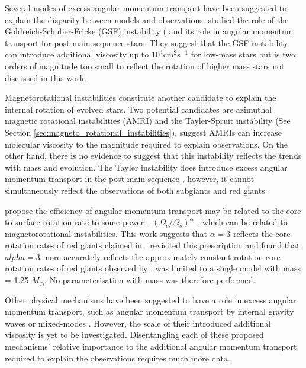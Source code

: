 Several modes of excess angular momentum transport have been suggested to explain the disparity between models and observations.
\citet{barker_angular_2019,barker_angular_2020} studied the role of
the Goldreich-Schuber-Fricke (GSF) instability (\citep{goldreich_differential_1967,fricke_rotation_1967} and its role in angular momentum transport for post-main-sequence stars.
They suggest that the GSF instability can introduce additional viscosity up to $10^4 \text{cm}^2 \text{s}^{-1}$ for low-mass stars but is two orders of magnitude too small to reflect the rotation of higher mass stars not discussed in this work.

Magnetorotational instabilities constitute another candidate to explain the internal rotation of evolved stars.
Two potential candidates are azimuthal magnetic rotational instabilities (AMRI) \citep{ruediger_astrophysical_2014,rudiger_diffusive_2015} and the Tayler-Spruit instability \citep{spruit_dynamo_2002} (See Section \ref{sec:magneto_rotational_instabilities}).
\citet{rudiger_diffusive_2015} suggest AMRIs can increase molecular viscosity to the magnitude required to explain observations.
On the other hand, there is no evidence to suggest that this instability reflects the trends with mass and evolution.
The Tayler instability does introduce excess angular momentum transport in the post-main-sequence \citep{fuller_slowing_2019}, however, it cannot simultaneously reflect the observations of both subgiants and red giants \citep{eggenberger_asteroseismology_2019,den_hartogh_constraining_2019}.


\citet{spada_angular_2016} propose the efficiency of angular momentum transport may be related to the core to surface rotation rate to some power - $\left(\Omega_c/\Omega_s\right)^{\alpha}$ - which can be related to magnetorotational instabilities.
This work suggests that $\alpha = 3$ reflects the core rotation rates of red giants claimed in \citep{mosser_spin_2012}.
\citet{moyano_asteroseismology_2022} revisited this prescription and found that $alpha = 3$ more accurately reflects the approximately constant rotation core rotation rates of red giants observed by \citet{gehan_core_2018}.
\citet{spada_angular_2016} was limited to a single model with mass = 1.25 $M_{\odot}$.
No parameterisation with mass was therefore performed.

Other physical mechanisms have been suggested to have a role in excess angular momentum transport, such as angular momentum transport by internal gravity waves \citep{pincon_can_2017} or mixed-modes \citep{belkacem_angular_2015}. 
However, the scale of their introduced additional viscosity is yet to be investigated.
Disentangling each of these proposed mechanisms' relative importance to the additional angular momentum transport required to explain the observations requires much more data.


